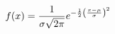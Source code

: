 \documentclass[preview]{standalone}
\begin{document}
\begin{align*}
\special{dvisvgm:raw <g id='unique000'>}f(x) = \frac{1}{\sigma\sqrt{2\pi}} e^{-\frac{1}{2}\left(\frac{x-\mu}{\sigma}\right)^2}\special{dvisvgm:raw </g>}
\end{align*}
\end{document}
